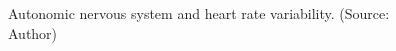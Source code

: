 \documentclass[
  a4paper,
  headsepline=true,
  open=any]{scrbook}
\begin{document}
\begin{figure}

\begin{minipage}[t]{\linewidth}

{\centering 


\caption{Autonomic nervous system and heart rate variability. (Source:
Author)}

}

\end{minipage}%

\end{figure}
\end{document}
